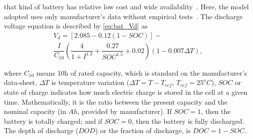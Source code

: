 \documentclass[journal]{IEEEtran}
\begin{document}
%
%
%
%
that kind of battery has relative low cost and wide availability~\cite{Copetti}. 
%
Here, the model adopted uses only manufacturer's data without empirical tests~\cite{Copetti}. %
%
The discharge voltage equation is described by \eqref{eq:bat_Vd} as
%
\begin{multline}
\label{eq:bat_Vd}
V_{d} = \left[ 2.085-0.12(1-SOC) \right] - \\ \dfrac{I}{C_{10}} \left( \dfrac{4}{1+I^{1.3}} + \dfrac{0.27}{SOC^{1.5}}+0.02 \right) (1-0.007 \Delta T),
\end{multline}

\noindent where $C_{10}$ means 10h of rated capacity, which is standard on the manufacturer's data-sheet, $\Delta T$ is temperature variation ($\Delta T=T-T_{ref} $, $ T_{ref}=25^{o}C $), $ SOC $ or state of charge indicates how much electric charge is stored in the cell at a given time. Mathematically, it is the ratio between the present capacity and the nominal capacity (in $ Ah $, provided by manufacturer). If $SOC=1$, then the battery is totally charged; and if $ SOC=0 $, then the battery is fully discharged.  %
%
%
The depth of discharge ($DOD$) or the fraction of discharge, is $DOC=1-SOC$.

%
%
\end{document}

